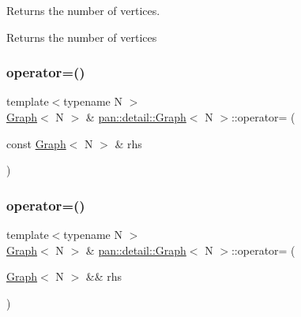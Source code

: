 Returns the number of vertices. \begin{DoxyReturn}{Returns}
the number of vertices 
\end{DoxyReturn}
\mbox{\label{classpan_1_1detail_1_1_graph_aed16e054462d1f7d7d063e3be862a11a}} 
\subsubsection{\texorpdfstring{operator=()}{operator=()}\hspace{0.1cm}{\footnotesize\ttfamily [1/2]}}
{\footnotesize\ttfamily template$<$typename N $>$ \\
\hyperlink{classpan_1_1detail_1_1_graph}{Graph}$<$ N $>$ \& \hyperlink{classpan_1_1detail_1_1_graph}{pan\+::detail\+::\+Graph}$<$ N $>$\+::operator= (\begin{DoxyParamCaption}\item[{const \hyperlink{classpan_1_1detail_1_1_graph}{Graph}$<$ N $>$ \&}]{rhs }\end{DoxyParamCaption})}

\mbox{\label{classpan_1_1detail_1_1_graph_a620d5389f1c950b960ce9b9053bed628}} 
\subsubsection{\texorpdfstring{operator=()}{operator=()}\hspace{0.1cm}{\footnotesize\ttfamily [2/2]}}
{\footnotesize\ttfamily template$<$typename N $>$ \\
\hyperlink{classpan_1_1detail_1_1_graph}{Graph}$<$ N $>$ \& \hyperlink{classpan_1_1detail_1_1_graph}{pan\+::detail\+::\+Graph}$<$ N $>$\+::operator= (\begin{DoxyParamCaption}\item[{\hyperlink{classpan_1_1detail_1_1_graph}{Graph}$<$ N $>$ \&\&}]{rhs }\end{DoxyParamCaption})}

\mbox{\label{classpan_1_1detail_1_1_graph_abfeef8f9146709aae343974ae595f080}} 
